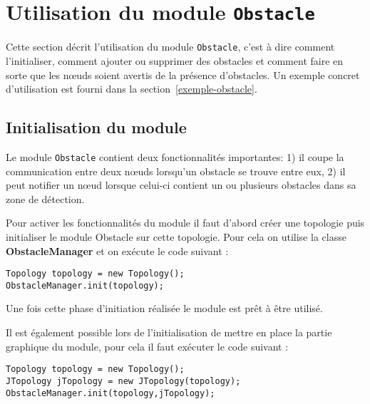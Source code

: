 \documentclass{article}
\newcommand{\obstacle}{{\tt Obstacle}\xspace}
\begin{document}
\section{Utilisation du module \obstacle}
\label{utilisation}

Cette section décrit l'utilisation du module \obstacle , c'est à dire comment l'initialiser, comment ajouter ou supprimer des obstacles et comment faire en sorte que les n\oe uds soient avertis de la présence d'obstacles. Un exemple concret d'utilisation est fourni dans la section~\ref{exemple-obstacle}.

\subsection{Initialisation du module}
\label{obstacle:section:init}
Le module \obstacle contient deux fonctionnalités importantes: 1) il coupe la communication entre deux n\oe uds lorsqu'un obstacle se trouve entre eux, 2) il peut notifier un n\oe ud lorsque celui-ci contient un ou plusieurs obstacles dans sa zone de détection.\medskip

Pour activer les fonctionnalités du module il faut d'abord créer une topologie puis  initialiser le module Obstacle sur cette topologie. Pour cela on utilise la classe \textbf{ObstacleManager} et on exécute le code suivant :\smallskip
\begin{lstlisting}[frame=single]
Topology topology = new Topology();
ObstacleManager.init(topology);
\end{lstlisting}\smallskip

Une fois cette phase d'initiation réalisée le module est prêt à être utilisé.\medskip

Il est également possible lors de l'initialisation de mettre en place la partie graphique du module, pour cela il faut exécuter le code suivant :\smallskip
\begin{lstlisting}[frame=single]
Topology topology = new Topology();
JTopology jTopology = new JTopology(topology);
ObstacleManager.init(topology,jTopology);
\end{lstlisting}
\end{document}
